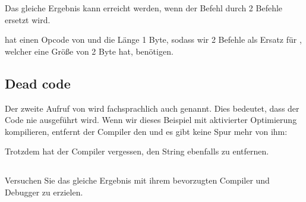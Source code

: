 
Das gleiche Ergebnis kann erreicht werden, wenn der \JMP Befehl durch 2 \NOP Befehle ersetzt wird.

\NOP hat einen Opcode von  und die Länge 1 Byte, sodass wir 2 Befehle als Ersatz für \JMP, welcher eine Größe
von 2 Byte hat, benötigen.

\subsection{Dead code}
Der zweite Aufruf von \printf wird fachsprachlich auch  genannt.
Dies bedeutet, dass der Code nie ausgeführt wird. Wenn wir dieses Beispiel mit aktivierter Optimierung kompilieren,
entfernt der Compiler den  und es gibt keine Spur mehr von ihm:



Trotzdem hat der Compiler vergessen, den  String ebenfalls zu entfernen.


\subsection{\Exercise}

Versuchen Sie das gleiche Ergebnis mit ihrem bevorzugten Compiler und Debugger zu erzielen.

